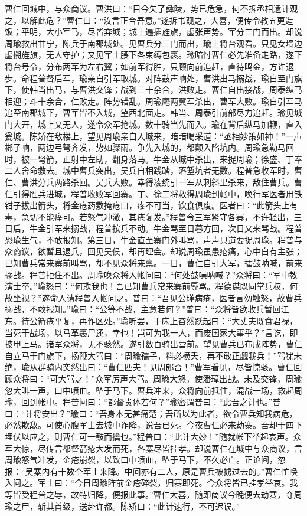 曹仁回城中，与众商议。曹洪曰：“目今失了彝陵，势已危急，何不拆丞相遗计观之，以解此危？”曹仁曰：“汝言正合吾意。”遂拆书观之，大喜，便传令教五更造饭；平明，大小军马，尽皆弃城；城上遍插旌旗，虚张声势。军分三门而出。却说周瑜救出甘宁，陈兵于南郡城处。见曹兵分三门而出，瑜上将台观看。只见女墙边虚搠旌旗，无人守护；又见军士腰下各束缚包裹。瑜暗忖曹仁必先准备走路，遂下将台号令，分布两军为左右翼；如前军得胜，只顾向前追赶，直待鸣金，方许退步。命程普督后军，瑜亲自引军取城。对阵鼓声响处，曹洪出马搦战，瑜自至门旗下，使韩当出马，与曹洪交锋；战到三十余合，洪败走。曹仁自出接战，周泰纵马相迎；斗十余合，仁败走。阵势错乱。周瑜麾两翼军杀出，曹军大败。瑜自引军马追至南郡城下，曹军皆不入城，望西北面走。韩当、周泰引前部尽力追赶。瑜见城门大开，城上又无人，遂令众军抢城。数十骑当先而入。瑜在背后纵马加鞭，直入瓮城。陈矫在敌楼上，望见周瑜亲自入城来，暗暗喝采道：“丞相妙策如神！”一声梆子响，两边弓弩齐发，势如骤雨。争先入城的，都颠入陷坑内。周瑜急勒马回时，被一弩箭，正射中左助，翻身落马。牛金从城中杀出，来捉周瑜；徐盛、丁奉二人舍命救去。城中曹兵突出，吴兵自相践踏，落堑坑者无数。程普急收军时，曹仁、曹洪分兵两路杀回。吴兵大败。幸得凌统引一军从刺斜里杀来，敌住曹兵。曹仁引得胜兵进城，程普收败军回寨。丁、徐二将救得周瑜到帐中，唤行军医者用铁钳子拔出箭头，将金疮药敷掩疮口，疼不可当，饮食俱废。医者曰：“此箭头上有毒，急切不能痊可。若怒气冲激，其疮复发。”程普令三军紧守各寨，不许轻出，三日后，牛金引军来搦战，程普按兵不动。牛金骂至日暮方回，次日又来骂战。程普恐瑜生气，不敢报知。第三日，牛金直至寨门外叫骂，声声只道要捉周瑜。程普与众商议，欲暂且退兵，回见吴侯，却再理会。却说周瑜虽患疮痛，心中自有主张；已知曹兵常来寨前叫骂，却不见众将来禀。一日，曹仁自引大军，擂鼓呐喊，前来搦战。程普拒住不出。周瑜唤众将入帐问曰：“何处鼓噪呐喊？”众将曰：“军中教演士卒。”瑜怒曰：“何欺我也！吾已知曹兵常来寨前辱骂。程德谋既同掌兵权，何故坐视？”遂命人请程普入帐问之。普曰：“吾见公瑾病疮，医者言勿触怒，故曹兵搦战，不敢报知。”瑜曰：“公等不战，主意若何？”普曰：“众将皆欲收兵暂回江东。待公箭疮平复，再作区处。”瑜听罢，于床上奋然跃起曰：“大丈夫既食君禄，当死于战场，以马革裹尸还，幸也！岂可为我一人，而废国家大事乎？”言讫，即披甲上马。诸军众将，无不骇然。遂引数百骑出营前。望见曹兵已布成阵势，曹仁自立马于门旗下，扬鞭大骂曰：“周瑜孺子，料必横夭，再不敢正觑我兵！”骂犹未绝，瑜从群骑内突然出曰：“曹仁匹夫！见周郎否！”曹军看见，尽皆惊骇。曹仁回顾众将曰：“可大骂之！”众军厉声大骂。周瑜大怒，使潘璋出战。未及交锋，周瑜忽大叫一声，口中喷血。坠于马下。曹兵冲来，众将向前抵住，混战一场，救起周瑜，回到帐中。程普问曰：“都督贵体若何？”瑜密谓普曰：“此吾之计也。”普曰：“计将安出？”瑜曰：“吾身本无甚痛楚；吾所以为此者，欲令曹兵知我病危，必然欺敌。可使心腹军士去城中诈降，说吾已死。今夜曹仁必来劫寨。吾却于四下埋伏以应之，则曹仁可一鼓而擒也。”程普曰：“此计大妙！”随就帐下举起哀声。众军大惊，尽传言都督箭疮大发而死，各寨尽皆挂孝。却说曹仁在城中与众商议，言周瑜怒气冲发，金疮崩裂，以致口中喷血，坠于马下，不久必亡。正论间，忽报：“吴寨内有十数个军士来降。中间亦有二人，原是曹兵被掳过去的。”曹仁忙唤入问之。军士曰：“今日周瑜阵前金疮碎裂，归寨即死。今众将皆已挂孝举哀。我等皆受程普之辱，故特归降，便报此事。”曹仁大喜，随即商议今晚便去劫寨，夺周瑜之尸，斩其首级，送赴许都。陈矫曰：“此计速行，不可迟误。”

